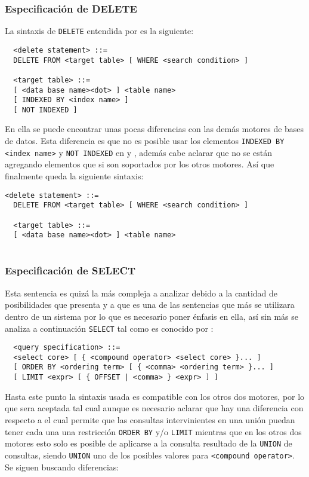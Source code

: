 \subsubsection{Especificación de DELETE} 
\label{especificacion:dialectos:delete}
La sintaxis de \verb=DELETE= entendida por \s es la siguiente:
%
\begin{Verbatim}
  <delete statement> ::=
  DELETE FROM <target table> [ WHERE <search condition> ]

  <target table> ::=
  [ <data base name><dot> ] <table name>
  [ INDEXED BY <index name> ]
  [ NOT INDEXED ]
\end{Verbatim}
%
En ella se puede encontrar unas pocas diferencias con las demás motores de bases de datos. Esta diferencia es que no es posible usar los elementos \verb=INDEXED BY <index name>= y \verb=NOT INDEXED= en \p y \m, además cabe aclarar que no se están agregando elementos que si son soportados por los otros motores. Así que finalmente queda la siguiente sintaxis:
%
%
\begin{Verbatim}[frame=single, label=sintaxis para DELETE]
  <delete statement> ::=
  DELETE FROM <target table> [ WHERE <search condition> ]
  
  <target table> ::=
  [ <data base name><dot> ] <table name>
  
\end{Verbatim}
%
%
%
%
\subsubsection{Especificación de SELECT} 
\label{especificacion:dialectos:select}
Esta sentencia es quizá la más compleja a analizar debido a la cantidad de posibilidades que presenta y a que es una de las sentencias que más se utilizara dentro de un sistema por lo que es necesario poner énfasis en ella, así sin más se analiza a continuación \verb=SELECT= tal como es conocido por \s:
%
\begin{Verbatim}
  <query specification> ::=
  <select core> [ { <compound operator> <select core> }... ]
  [ ORDER BY <ordering term> [ { <comma> <ordering term> }... ]
  [ LIMIT <expr> [ { OFFSET | <comma> } <expr> ] ]  
\end{Verbatim}
%
Hasta este punto la sintaxis usada es compatible con los otros dos motores, por lo que sera aceptada tal cual aunque es necesario aclarar que hay una diferencia con respecto a \m el cual permite que las consultas intervinientes en una unión puedan tener cada una una restricción \verb=ORDER BY= y/o \verb=LIMIT= mientras que en los otros dos motores esto solo es posible de aplicarse a la consulta resultado de la \verb=UNION= de consultas, siendo \verb=UNION= uno de los posibles valores para \verb=<compound operator>=. Se siguen buscando diferencias:

